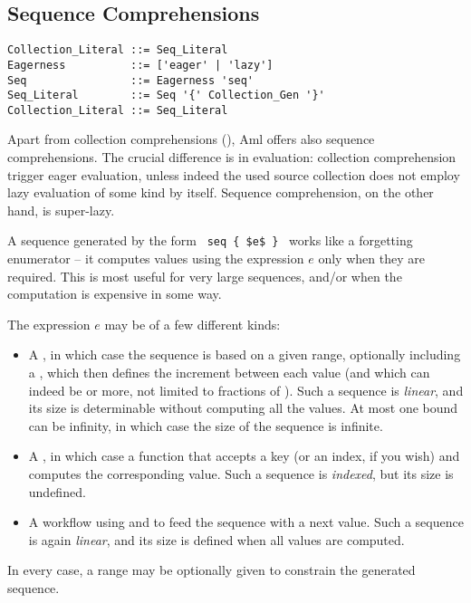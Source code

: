 \subsection{Sequence Comprehensions}
\label{sec:sequence-comprehensions}

\grammar\begin{lstlisting}
Collection_Literal ::= Seq_Literal
Eagerness          ::= ['eager' | 'lazy']
Seq                ::= Eagerness 'seq'
Seq_Literal        ::= Seq '{' Collection_Gen '}'
Collection_Literal ::= Seq_Literal
\end{lstlisting}

Apart from collection comprehensions (), Aml offers also sequence comprehensions. The crucial difference is in evaluation: collection comprehension trigger eager evaluation, unless indeed the used source collection does not employ lazy evaluation of some kind by itself. Sequence comprehension, on the other hand, is super-lazy. 

A sequence generated by the form ~\lstinline!seq { $e$ }!~ works like a forgetting enumerator -- it computes values using the expression $e$ only when they are required. This is most useful for very large sequences, and/or when the computation is expensive in some way. 

The expression $e$ may be of a few different kinds:
\begin{itemize}
  \item A , in which case the sequence is based on a given range, optionally including a , which then defines the increment between each value (and which can indeed be  or more, not limited to fractions of ). Such a sequence is {\em linear}, and its size is determinable without computing all the values. At most one bound can be infinity, in which case the size of the sequence is infinite. 
  \item A , in which case a function that accepts a key (or an index, if you wish) and computes the corresponding value. Such a sequence is {\em indexed}, but its size is undefined. 
  \item A workflow using  and  to feed the sequence with a next value. Such a sequence is again {\em linear}, and its size is defined when all values are computed. 
\end{itemize}

In every case, a range may be optionally given to constrain the generated sequence. 

